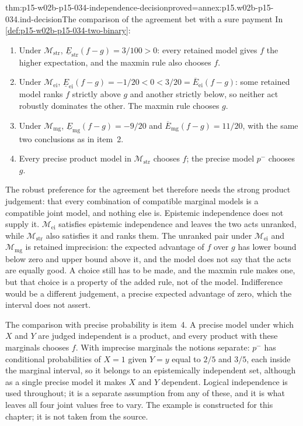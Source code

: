 \begin{hbtheorem}{thm:p15-w02b-p15-034-independence-decision}{proved=annex:p15.w02b-p15-034.ind-decision}{The comparison of the agreement bet with a sure payment}
In \cref{def:p15-w02b-p15-034-two-binary}:
\begin{enumerate}
\item Under \(\mathcal M_{\mathrm{str}}\),
\(\underline E_{\mathrm{str}}(f-g)=3/100>0\): every retained model gives
\(f\) the higher expectation, and the maxmin rule also chooses \(f\).
\item Under \(\mathcal M_{\mathrm{ei}}\),
\(\underline E_{\mathrm{ei}}(f-g)=-1/20<0<3/20=\overline E_{\mathrm{ei}}(f-g)\):
some retained model ranks \(f\) strictly above \(g\) and another strictly
below, so neither act robustly dominates the other. The maxmin rule chooses
\(g\).
\item Under \(\mathcal M_{\mathrm{mg}}\),
\(\underline E_{\mathrm{mg}}(f-g)=-9/20\) and
\(\overline E_{\mathrm{mg}}(f-g)=11/20\), with the same two conclusions as
in item~2.
\item Every precise product model in \(\mathcal M_{\mathrm{str}}\) chooses
\(f\); the precise model \(p^-\) chooses \(g\).
\end{enumerate}
\end{hbtheorem}

The robust preference for the agreement bet therefore needs the strong
product judgement: that every combination of compatible marginal models is
a compatible joint model, and nothing else is. Epistemic independence does
not supply it. \(\mathcal M_{\mathrm{ei}}\) satisfies epistemic
independence and leaves the two acts unranked, while
\(\mathcal M_{\mathrm{str}}\) also satisfies it and ranks them. The
unranked pair under \(\mathcal M_{\mathrm{ei}}\) and
\(\mathcal M_{\mathrm{mg}}\) is retained imprecision: the expected advantage
of \(f\) over \(g\) has lower bound below zero and upper bound above it,
and the model does not say that the acts are equally good. A choice still
has to be made, and the maxmin rule makes one, but that choice is a
property of the added rule, not of the model. Indifference would be a
different judgement, a precise expected advantage of zero, which the
interval does not assert.

The comparison with precise probability is item~4. A precise model under
which \(X\) and \(Y\) are judged independent is a product, and every
product with these marginals chooses \(f\). With imprecise marginals the
notions separate: \(p^-\) has conditional probabilities of \(X=1\) given
\(Y=y\) equal to \(2/5\) and \(3/5\), each inside the marginal interval, so
it belongs to an epistemically independent set, although as a single
precise model it makes \(X\) and \(Y\) dependent. Logical independence is
used throughout; it is a separate assumption from any of these, and it is
what leaves all four joint values free to vary. The example is constructed
for this chapter; it is not taken from the source.

